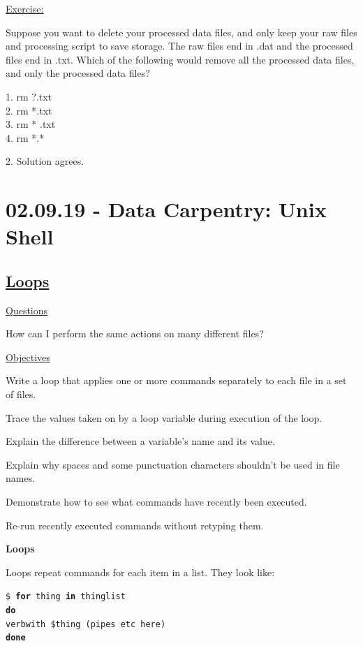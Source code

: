 \documentclass[12pt]{article}
\begin{document}
\begin{addmargin}[1cm]{0cm}
\color{gray}
\underline{Exercise:}

Suppose you want to delete your processed data files, and only keep your raw files and processing script to save storage. The raw files end in .dat and the processed files end in .txt. Which of the following would remove all the processed data files, and only the processed data files?

1. rm ?.txt
\\2. rm *.txt
\\3. rm * .txt
\\4. rm *.*

\color{black}
2. Solution agrees.
\end{addmargin}

\newpage\section{02.09.19 - Data Carpentry: Unix Shell}
\subsection{\href{http://swcarpentry.github.io/shell-novice/05-loop/index.html}{\textbf{Loops}}}
\color{gray}
\underline{Questions}

How can I perform the same actions on many different files?

\vspace{1em}
\underline{Objectives}

Write a loop that applies one or more commands separately to each file in a set of files.

Trace the values taken on by a loop variable during execution of the loop.

Explain the difference between a variable’s name and its value.

Explain why spaces and some punctuation characters shouldn’t be used in file names.

Demonstrate how to see what commands have recently been executed.

Re-run recently executed commands without retyping them.

\color{black}
\vspace{1em}\textbf{Loops}

Loops repeat commands for each item in a list. They look like:

\texttt{\$ \textbf{for} thing \textbf{in} thinglist
\\\textbf{do}
\\    verbwith \$thing (pipes etc here)
\\\textbf{done}}
\end{document}
